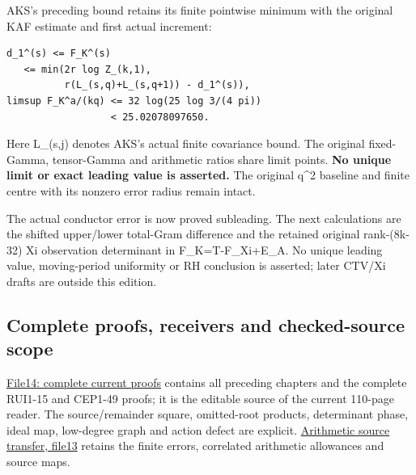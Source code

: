 \documentclass[
]{article}
\begin{document}
AKS's preceding bound retains its finite pointwise minimum with the
original KAF estimate and first actual increment:

\begin{verbatim}
d_1^(s) <= F_K^(s)
   <= min(2r log Z_(k,1),
          r(L_(s,q)+L_(s,q+1)) - d_1^(s)),
limsup F_K^a/(kq) <= 32 log(25 log 3/(4 pi))
                  < 25.02078097650.
\end{verbatim}

Here L\_(s,j) denotes AKS's actual finite covariance bound. The original
fixed-Gamma, tensor-Gamma and arithmetic ratios share limit points.
\textbf{No unique limit or exact leading value is asserted.} The
original q\^{}2 baseline and finite centre with its nonzero error radius
remain intact.

The actual conductor error is now proved subleading. The next
calculations are the shifted upper/lower total-Gram difference and the
retained original rank-(8k-32) Xi observation determinant in
F\_K=T-F\_Xi+E\_A. No unique leading value, moving-period uniformity or
RH conclusion is asserted; later CTV/Xi drafts are outside this edition.

\subsection{Complete proofs, receivers and checked-source
scope}\label{complete-proofs-receivers-and-checked-source-scope-1}

\href{https://github.com/KokunoYumeto/zeta-function-research-reader/blob/dad07e28faa735104ddc0b137521620fc315e6fc/workbenches/splitzero-tandem/continuations/20260914-exterior-kernel-continuation/14_CURRENT_KERNEL_AND_MULTIPLICITY_PROOFS.tex}{File14:
complete current proofs} contains all preceding chapters and the
complete RUI1-15 and CEP1-49 proofs; it is the editable source of the
current 110-page reader. The source/remainder square, omitted-root
products, determinant phase, ideal map, low-degree graph and action
defect are explicit.
\href{https://github.com/KokunoYumeto/zeta-function-research-reader/blob/dad07e28faa735104ddc0b137521620fc315e6fc/workbenches/splitzero-tandem/continuations/20260914-exterior-kernel-continuation/13_ARITHMETIC_MIXED_TRANSFER.tex}{Arithmetic
source transfer, file13} retains the finite errors, correlated
arithmetic allowances and source maps.
\end{document}
